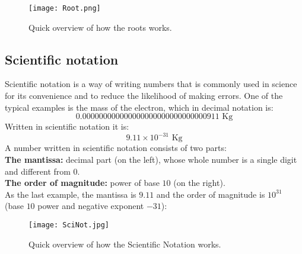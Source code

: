 \documentclass{article} %
\begin{document}
\begin{figure}[H]
    \centering
    \texttt{[image: Root.png]}
    \caption{Quick overview of how the roots works.}
    \label{fig:etiqueta}
\end{figure}

\subsection{Scientific notation}
Scientific notation is a way of writing numbers that is commonly used in science for its convenience and to reduce the likelihood of making errors. One of the typical examples is the mass of the electron, which in decimal notation is:
\[
0.000000000000000000000000000000911 \text{ Kg}
\]
Written in scientific notation it is:
\[
9.11 \times 10^{-31} \text{ Kg}
\]
A number written in scientific notation consists of two parts:\\
\textbf{The mantissa:} decimal part (on the left), whose whole number is a single digit and different from $0$.\\
\textbf{The order of magnitude:} power of base $10$ (on the right).\\
As the last example, the mantissa is $9.11$ and the order of magnitude is $10^{31}$ (base $10$ power and negative exponent $-31$):
\begin{figure}[H]
    \centering
    \texttt{[image: SciNot.jpg]}
    \caption{Quick overview of how the Scientific Notation works.}
    \label{fig:etiqueta}
\end{figure}
\end{document}
